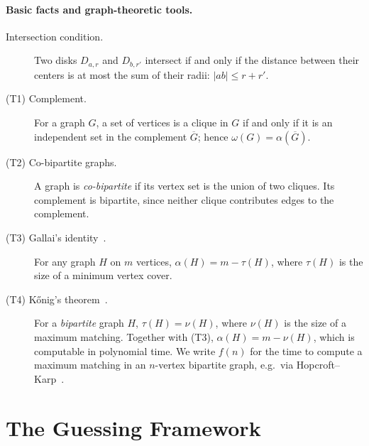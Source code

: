 \documentclass[12pt]{article}
\begin{document}
\paragraph{Basic facts and graph-theoretic tools.}

\begin{description}
  \item[Intersection condition.] Two disks $D_{a,r}$ and $D_{b,r'}$ intersect
    if and only if the distance between their centers is at most the sum of
    their radii: $|ab| \leq r + r'$.

  \item[(T1) Complement.] For a graph $G$, a set of vertices is a clique in
    $G$ if and only if it is an independent set in the complement
    $\overline{G}$; hence $\omega(G) = \alpha(\overline{G})$.

  \item[(T2) Co-bipartite graphs.] A graph is \emph{co-bipartite} if its
    vertex set is the union of two cliques. Its complement is bipartite,
    since neither clique contributes edges to the complement.

  \item[(T3) Gallai's identity~\cite{gallai1959}.] For any graph $H$ on $m$ vertices,
    $\alpha(H) = m - \tau(H)$, where $\tau(H)$ is the size of a minimum
    vertex cover.

  \item[(T4) K\H{o}nig's theorem~\cite{konig1931,kleinbergtardos2006}.] For a \emph{bipartite} graph $H$,
    $\tau(H) = \nu(H)$, where $\nu(H)$ is the size of a maximum matching.
    Together with (T3), $\alpha(H) = m - \nu(H)$, which is computable in
    polynomial time. We write $f(n)$ for the time to compute a maximum
    matching in an $n$-vertex bipartite graph, e.g.\ via Hopcroft--Karp~\cite{hopcroftkarp1973}.
\end{description}

\section{The Guessing Framework}\label{sec:guessing}
\end{document}
